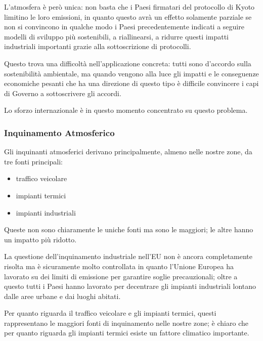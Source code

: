 L'atmosfera è però unica: non basta che i Paesi firmatari del protocollo
di Kyoto limitino le loro emissioni, in quanto questo avrà un effetto
solamente parziale se non si convincono in qualche modo i Paesi
precedentemente indicati a seguire modelli di sviluppo più sostenibili,
a riallinearsi, a ridurre questi impatti industriali importanti grazie
alla sottoscrizione di protocolli.

Questo trova una difficoltà nell'applicazione concreta: tutti sono
d'accordo sulla sostenibilità ambientale, ma quando vengono alla luce
gli impatti e le conseguenze economiche pesanti che ha una direzione di
questo tipo è difficile convincere i capi di Governo a sottoscrivere gli
accordi.

Lo sforzo internazionale è in questo momento concentrato su questo
problema.

\subsubsection{Inquinamento Atmosferico}


Gli inquinanti atmosferici derivano principalmente, almeno nelle nostre
zone, da tre fonti principali:

\begin{itemize}
\item
   
  traffico veicolare
   
\item
   
  impianti termici
   
\item
   
  impianti industriali
   
\end{itemize}

Queste non sono chiaramente le uniche fonti ma sono le maggiori; le
altre hanno un impatto più ridotto.

La questione dell'inquinamento industriale nell'EU non è ancora
completamente risolta ma è sicuramente molto controllata in quanto
l'Unione Europea ha lavorato su dei limiti di emissione per garantire
soglie precauzionali; oltre a questo tutti i Paesi hanno lavorato per
decentrare gli impianti industriali lontano dalle aree urbane e dai
luoghi abitati.

Per quanto riguarda il traffico veicolare e gli impianti termici, questi
rappresentano le maggiori fonti di inquinamento nelle nostre zone; è
chiaro che per quanto riguarda gli impianti termici esiste un fattore
climatico importante.

